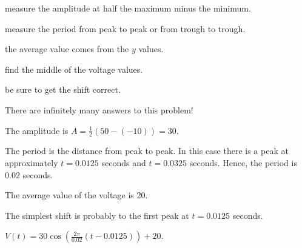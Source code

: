 \begin{bighint}
    \ba
        \item measure the amplitude at half the maximum minus the minimum.
        \item measure the period from peak to peak or from trough to trough.
        \item the average value comes from the $y$ values.
        \item find the middle of the voltage values.
        \item be sure to get the shift correct.  
        \item There are infinitely many answers to this
            problem!
    \ea
\end{bighint}
\begin{activitySolution}
   \ba
    \item The amplitude is $A = \frac{1}{2}(50-(-10)) = 30$.
    \item The period is the distance from peak to peak.  In this case there is a peak at
        approximately $t=0.0125$ seconds and $t = 0.0325$ seconds.  Hence, the period is
        $0.02$ seconds.
    \item The average value of the voltage is 20.
    \item The simplest shift is probably to the first peak at $t = 0.0125$ seconds.
    \item $V(t) = 30 \cos\left( \frac{2\pi}{0.02} \left( t - 0.0125 \right) \right) + 20$.
   \ea
\end{activitySolution}

\aftera
